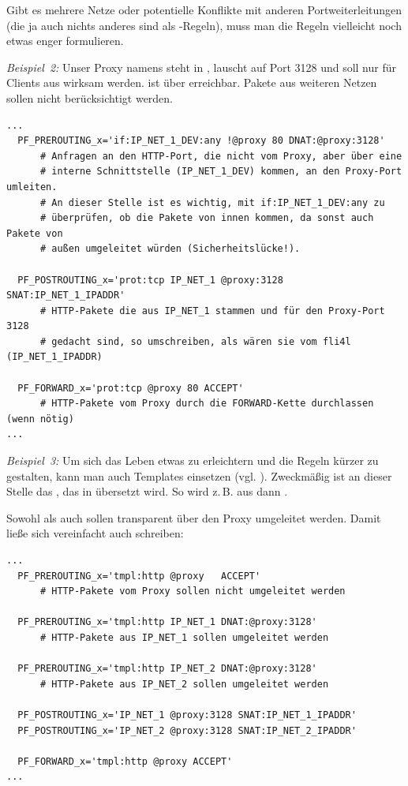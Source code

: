 Gibt es mehrere Netze oder potentielle Konflikte mit anderen
Portweiterleitungen (die ja auch nichts anderes sind als
-Regeln), muss man die Regeln vielleicht noch etwas enger
formulieren.

\emph{Beispiel~2:} Unser Proxy namens  steht in ,
lauscht auf Port 3128 und soll nur für Clients aus  wirksam
werden.  ist über  erreichbar. Pakete aus
weiteren Netzen sollen nicht berücksichtigt werden.

\begin{example}
\begin{verbatim}
...
  PF_PREROUTING_x='if:IP_NET_1_DEV:any !@proxy 80 DNAT:@proxy:3128'
      # Anfragen an den HTTP-Port, die nicht vom Proxy, aber über eine
      # interne Schnittstelle (IP_NET_1_DEV) kommen, an den Proxy-Port umleiten.
      # An dieser Stelle ist es wichtig, mit if:IP_NET_1_DEV:any zu
      # überprüfen, ob die Pakete von innen kommen, da sonst auch Pakete von
      # außen umgeleitet würden (Sicherheitslücke!).

  PF_POSTROUTING_x='prot:tcp IP_NET_1 @proxy:3128 SNAT:IP_NET_1_IPADDR'
      # HTTP-Pakete die aus IP_NET_1 stammen und für den Proxy-Port 3128
      # gedacht sind, so umschreiben, als wären sie vom fli4l (IP_NET_1_IPADDR)

  PF_FORWARD_x='prot:tcp @proxy 80 ACCEPT'
      # HTTP-Pakete vom Proxy durch die FORWARD-Kette durchlassen (wenn nötig)
...
\end{verbatim}
\end{example}

\emph{Beispiel~3:} Um sich das Leben etwas zu erleichtern und die Regeln
kürzer zu gestalten, kann man auch Templates einsetzen (vgl.
). Zweckmäßig ist an dieser
Stelle das , das in 
übersetzt wird. So wird z.\,B. aus 
dann .

Sowohl  als auch  sollen transparent über den
Proxy umgeleitet werden. Damit ließe sich vereinfacht auch schreiben:

\begin{example}
\begin{verbatim}
...
  PF_PREROUTING_x='tmpl:http @proxy   ACCEPT'
      # HTTP-Pakete vom Proxy sollen nicht umgeleitet werden

  PF_PREROUTING_x='tmpl:http IP_NET_1 DNAT:@proxy:3128'
      # HTTP-Pakete aus IP_NET_1 sollen umgeleitet werden

  PF_PREROUTING_x='tmpl:http IP_NET_2 DNAT:@proxy:3128'
      # HTTP-Pakete aus IP_NET_2 sollen umgeleitet werden

  PF_POSTROUTING_x='IP_NET_1 @proxy:3128 SNAT:IP_NET_1_IPADDR'
  PF_POSTROUTING_x='IP_NET_2 @proxy:3128 SNAT:IP_NET_2_IPADDR'

  PF_FORWARD_x='tmpl:http @proxy ACCEPT'
...
\end{verbatim}
\end{example}

